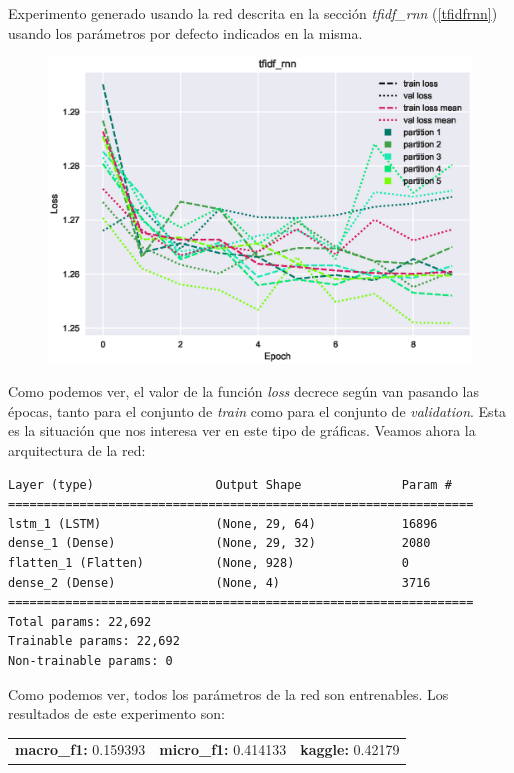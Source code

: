 \documentclass[11pt]{article}
\begin{document}
Experimento generado usando la red descrita en la sección \textit{tfidf\_rnn} (\ref{tfidfrnn}) usando los parámetros por defecto indicados en la misma.

\begin{figure}[H]
\includegraphics[width=\linewidth]{images/loss/tfidf_rnn-1554202898.eps}
\end{figure}

Como podemos ver, el valor de la función \textit{loss} decrece según van pasando las épocas, tanto para el conjunto de \textit{train} como para el conjunto de \textit{validation}. Esta es la situación que nos interesa ver en este tipo de gráficas. Veamos ahora la arquitectura de la red:

\begin{verbatim}
Layer (type)                 Output Shape              Param #   
=================================================================
lstm_1 (LSTM)                (None, 29, 64)            16896     
dense_1 (Dense)              (None, 29, 32)            2080      
flatten_1 (Flatten)          (None, 928)               0         
dense_2 (Dense)              (None, 4)                 3716      
=================================================================
Total params: 22,692
Trainable params: 22,692
Non-trainable params: 0
\end{verbatim}

Como podemos ver, todos los parámetros de la red son entrenables. Los resultados de este experimento son: 

\begin{table}[H]
\begin{tabular}{c|c|c}
\textbf{macro\_f1:} 0.159393 & \textbf{micro\_f1:} 0.414133 & \textbf{kaggle:} 0.42179
\end{tabular}
\end{table}
\end{document}
